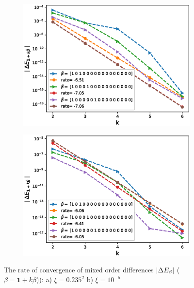 \documentclass[11pt]{article}
\begin{document}
\begin{figure}[h!]
\centering
\begin{subfigure}{.5\textwidth}
\centering
\includegraphics[width=1\linewidth]{./figures/effect_rho_differences/H_0_43_K_1/N_8/mixed_difference_order2_rbergomi_8steps_H_043_K_1_rho__0_9_with_rate_W1}
\caption{}
\label{fig:sub3}
\end{subfigure}%
\begin{subfigure}{.5\textwidth}
\centering
\includegraphics[width=1\linewidth]{./figures/effect_xi_differences/H_0_43_K_1/N_8/mixed_difference_order2_rbergomi_8steps_H_043_K_1_xi_10__5_with_rate_W1}
\caption{}
\label{fig:sub4}
\end{subfigure}

\caption{The rate of convergence of  mixed order differences $\left\lvert\Delta E_{\beta}\right\rvert$ ($\beta=\mathbf{1}+k \bar{\beta}$)): a) $\xi=0.235^2$ b)  $\xi=10^{-5}$}
\label{fig:test2}
\end{figure}
\end{document}
